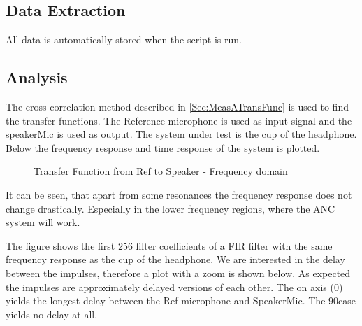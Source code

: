 \subsection{Data Extraction}

All data is automatically stored when the script  is run.



\subsection{Analysis}
The cross correlation method described in \autoref{Sec:MeasATransFunc} is used to find the transfer functions. The Reference microphone is used as input signal and the speakerMic is used as output. The system under test is the cup of the headphone. 
Below the frequency response and time response of the system is plotted. 
\begin{figure}[H]
	
	\label{Fig:AngOfIncFreq}
	\caption{Transfer Function from Ref to Speaker - Frequency domain}
\end{figure}
It can be seen, that apart from some resonances the frequency response does not change drastically. Especially in the lower frequency regions, where the ANC system will work. 

%	
The figure shows the first 256 filter coefficients of a FIR filter with the same frequency response as the cup of the headphone. We are interested in the delay between the impulses, therefore a plot with a zoom is shown below.
As expected the impulses are approximately delayed versions of each other. The on axis (0\degrees) yields the longest delay between the Ref microphone and SpeakerMic. The 90\degrees  case yields no delay at all. 


